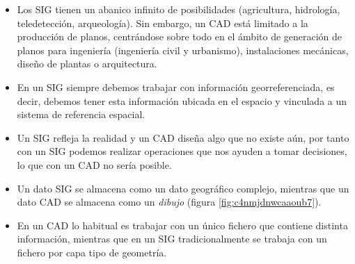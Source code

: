 \begin{itemize}
	
	\item Los SIG tienen un abanico infinito de posibilidades (agricultura, hidrología, teledetección, arqueología). Sin embargo, un CAD está limitado a la producción de planos, centrándose sobre todo en el ámbito de generación de planos para ingeniería (ingeniería civil y urbanismo), instalaciones mecánicas, diseño de plantas o arquitectura.
	
	\item En un SIG siempre debemos trabajar con información georreferenciada, es decir, debemos tener esta información ubicada en el espacio y vinculada a un sistema de referencia espacial.
	
	
	
	\item Un SIG refleja la realidad y un CAD diseña algo que no existe aún, por tanto con un SIG podemos realizar operaciones que nos ayuden a tomar decisiones, lo que con un CAD no sería posible.
	
	\item Un dato SIG se almacena como un dato geográfico complejo, mientras que un dato CAD se almacena como un \textit{dibujo} (figura \ref{fig:c4nmjdnwcaaoub7}).
	
	\item En un CAD lo habitual es trabajar con un único fichero que contiene distinta información, mientras que en un SIG tradicionalmente se trabaja con un fichero por capa tipo de geometría.
	
\end{itemize}




